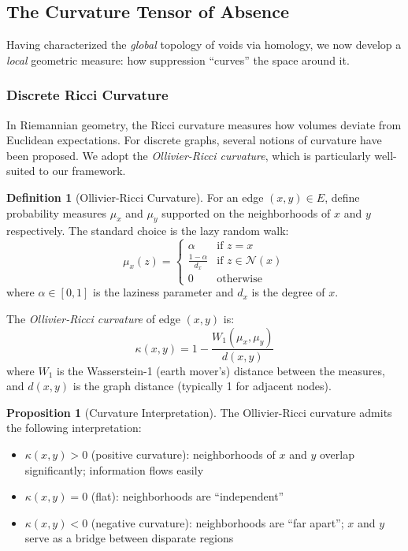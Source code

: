 \documentclass[12pt,a4paper]{article}
\theoremstyle{definition}
\newtheorem{definition}{Definition}[section]
\newtheorem{proposition}[theorem]{Proposition}
\theoremstyle{remark}
\begin{document}
\subsection{The Curvature Tensor of Absence}

Having characterized the \emph{global} topology of voids via homology, we now develop a \emph{local} geometric measure: how suppression ``curves'' the space around it.

\subsubsection{Discrete Ricci Curvature}

In Riemannian geometry, the Ricci curvature measures how volumes deviate from Euclidean expectations. For discrete graphs, several notions of curvature have been proposed. We adopt the \emph{Ollivier-Ricci curvature}, which is particularly well-suited to our framework.

\begin{definition}[Ollivier-Ricci Curvature]
For an edge $(x, y) \in E$, define probability measures $\mu_x$ and $\mu_y$ supported on the neighborhoods of $x$ and $y$ respectively. The standard choice is the lazy random walk:
\begin{equation}
    \mu_x(z) = \begin{cases}
        \alpha & \text{if } z = x \\
        \frac{1-\alpha}{d_x} & \text{if } z \in \mathcal{N}(x) \\
        0 & \text{otherwise}
    \end{cases}
\end{equation}
where $\alpha \in [0,1]$ is the laziness parameter and $d_x$ is the degree of $x$.

The \emph{Ollivier-Ricci curvature} of edge $(x,y)$ is:
\begin{equation}
    \boxed{
    \kappa(x, y) = 1 - \frac{W_1(\mu_x, \mu_y)}{d(x, y)}
    }
\end{equation}
where $W_1$ is the Wasserstein-1 (earth mover's) distance between the measures, and $d(x,y)$ is the graph distance (typically 1 for adjacent nodes).
\end{definition}

\begin{proposition}[Curvature Interpretation]
The Ollivier-Ricci curvature admits the following interpretation:
\begin{itemize}
    \item $\kappa(x,y) > 0$ (positive curvature): neighborhoods of $x$ and $y$ overlap significantly; information flows easily
    \item $\kappa(x,y) = 0$ (flat): neighborhoods are ``independent''
    \item $\kappa(x,y) < 0$ (negative curvature): neighborhoods are ``far apart''; $x$ and $y$ serve as a bridge between disparate regions
\end{itemize}
\end{proposition}
\end{document}

